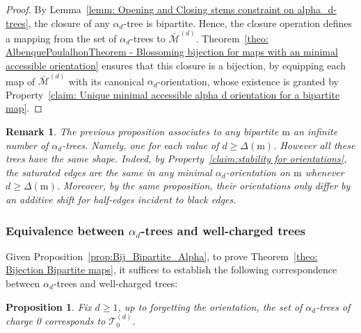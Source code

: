 \documentclass[11pt,reqno,tbtags]{amsart}
\renewcommand{\rm}{\mathrm{m}}
\newtheorem{prop}[theo]{Proposition}
\newtheorem{rema}[theo]{Remark}
\numberwithin{equation}{section}
\numberwithin{theo}{section}
\theoremstyle{definition}
\begin{document}
\begin{proof}
By Lemma~\ref{lemm: Opening and Closing stems constraint on alpha_d-trees}, the closure of any $\alpha_d$-tree is bipartite. Hence, the closure operation defines a mapping from the set of $\alpha_d$-trees to $\bar{\mathcal{M}}^{(d)}$. Theorem~\ref{theo: AlbenquePoulalhonTheorem - Blossoming bijection for maps with an minimal accessible orientation} ensures that this closure is a bijection, by equipping each map of $\bar{\mathcal{M}}^{(d)}$ with its canonical $\alpha_d$-orientation, whose existence is granted by Property~\ref{claim: Unique minimal accessible alpha d orientation for a bipartite map}.
\end{proof}

\begin{rema}\label{rem:infinite_bijection}
The previous proposition associates to any bipartite $\rm$ an infinite number of $\alpha_d$-trees. Namely, one for each value of $d\geq \Delta(\rm)$. However all these trees have the same shape. Indeed, by Property~\ref{claim:stability for orientations}, the saturated edges are the same in any minimal $\alpha_d$-orientation on $\rm$ whenever $d\geq \Delta(\rm)$. Moreover, by the same proposition, their orientations only differ by an additive shift for half-edges incident to black edges. 
\end{rema}

		\subsubsection{Equivalence between $\alpha_d$-trees and  well-charged trees}\label{sec: Planted trees}
Given Proposition~\ref{prop:Bij_Bipartite_Alpha}, to prove Theorem~\ref{theo: Bijection Bipartite maps}, it suffices to establish the following correspondence between $\alpha_d$-trees and well-charged trees: 
\begin{prop}\label{prop:bij_charge0}
Fix $d\geq 1$, up to forgetting the orientation, the set of $\alpha_d$-trees of charge 0 corresponds to $\mathcal{T}_0^{(d)}$. 
\end{prop}
\end{document}

